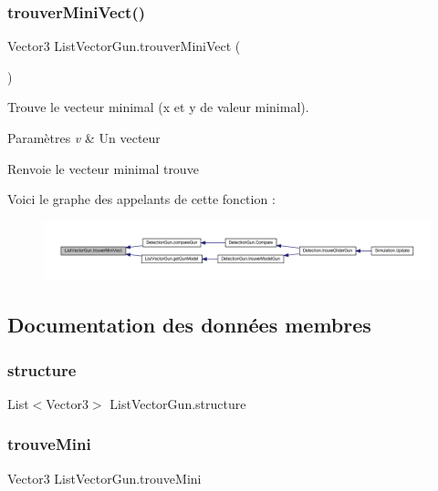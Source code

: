 \subsubsection{\texorpdfstring{trouver\+Mini\+Vect()}{trouverMiniVect()}}
{\footnotesize\ttfamily Vector3 List\+Vector\+Gun.\+trouver\+Mini\+Vect (\begin{DoxyParamCaption}{ }\end{DoxyParamCaption})\hspace{0.3cm}{\ttfamily [inline]}}



Trouve le vecteur minimal (x et y de valeur minimal). 


\begin{DoxyParams}{Paramètres}
{\em v} & Un vecteur\\
\hline
\end{DoxyParams}
\begin{DoxyReturn}{Renvoie}
le vecteur minimal trouve 
\end{DoxyReturn}
Voici le graphe des appelants de cette fonction \+:
\nopagebreak
\begin{figure}[H]
\begin{center}
\leavevmode
\includegraphics[width=350pt]{class_list_vector_gun_a305381e8b2d20184c1894c89d2726b2c_icgraph}
\end{center}
\end{figure}


\subsection{Documentation des données membres}
\mbox{\label{class_list_vector_gun_a2cdf82f24fbd46a3705bb6a3887f53c4}} 
\subsubsection{\texorpdfstring{structure}{structure}}
{\footnotesize\ttfamily List$<$Vector3$>$ List\+Vector\+Gun.\+structure\hspace{0.3cm}{\ttfamily [private]}}

\mbox{\label{class_list_vector_gun_af6572c296759eb4bf06e96275ce75c77}} 
\subsubsection{\texorpdfstring{trouve\+Mini}{trouveMini}}
{\footnotesize\ttfamily Vector3 List\+Vector\+Gun.\+trouve\+Mini\hspace{0.3cm}{\ttfamily [private]}}

